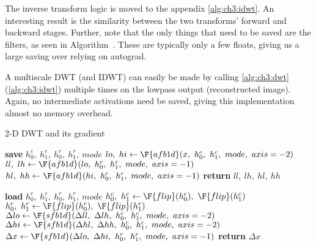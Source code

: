 The inverse transform logic is moved to the appendix
\autoref{alg:ch3:idwt}. An interesting result is the similarity between the two 
transforms' forward and backward stages. Further, note that the only things that
need to be saved are the filters, as seen in
Algorithm~. These are typically only a
few floats, giving us a large saving over relying on autograd.

A multiscale DWT (and IDWT) can easily be made by calling \autoref{alg:ch3:dwt}
(\autoref{alg:ch3:idwt}) multiple times on the lowpass output (reconstructed
image). Again, no intermediate activations need be saved, giving this
implementation almost no memory overhead. 

\begin{algorithm}[tb]
\caption{2-D DWT and its gradient}\label{alg:ch3:dwt}
\begin{algorithmic}[1]
  \State \textbf{save} $h_0^c,\ h_1^c,\ h_0^r,\ h_1^r,\ mode$  \label{line:ch3:dwt_save}
  \State $lo,\ hi \gets \F{afb1d}(x,\ h_0^c,\ h_1^c,\ mode,\ axis=-2)$ 
  \State $ll,\ lh \gets \F{afb1d}(lo,\ h_0^r,\ h_1^r,\ mode,\ axis=-1)$ 
  \State $hl,\ hh \gets \F{afb1d}(hi,\ h_0^r,\ h_1^r,\ mode,\ axis=-1)$ 
  \State \textbf{return} $ll,\ lh,\ hl,\ hh$
\EndFunction
\end{algorithmic}\vspace{10pt}
\begin{algorithmic}[1]
  \State \textbf{load} $h_0^c,\ h_1^c,\ h_0^r,\ h_1^r,\ mode$
  \State $ h_0^c,\ h_1^c \gets \F{flip}(h_0^c),\ \F{flip}(h_1^c) $
  \State $ h_0^r,\ h_1^r \gets \F{flip}(h_0^r),\ \F{flip}(h_1^r)$ 
  \State $\Delta lo \gets \F{sfb1d}(\Delta ll,\ \Delta lh,\ h_0^c,\ h_1^c,\ mode,\ axis=-2) $
  \State $\Delta hi \gets \F{sfb1d}(\Delta hl,\ \Delta hh,\ h_0^c,\ h_1^c,\ mode,\ axis=-2) $
  \State $\Delta x \gets \F{sfb1d}(\Delta lo,\ \Delta hi,\ h_0^r,\ h_1^r,\ mode,\ axis=-1) $
  \State \textbf{return} $\Delta x$
\EndFunction
\end{algorithmic}
\end{algorithm}


